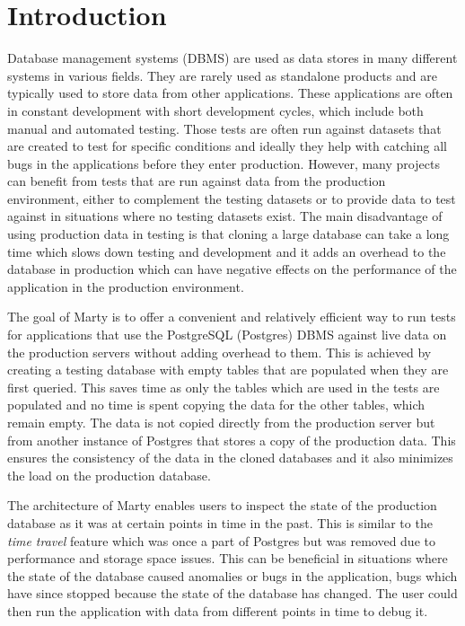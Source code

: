 \chapter{Introduction}
\setcounter{page}{1}
Database management systems (DBMS) are used as data stores in many different systems in various fields.
They are rarely used as standalone products and are typically used to store data from other applications.
These applications are often in constant development with short development cycles, which include both manual and automated testing.
Those  tests are often run against datasets that are created to test for specific conditions and ideally they help with catching all bugs in the applications before they enter production. However, many projects can benefit from tests that are run against data from the production environment, either to complement the testing datasets or to provide data to test against in situations where no testing datasets exist.
The main disadvantage of using production data in testing is that cloning a large database can take a long time which slows down testing and development and it adds an overhead to the database in production which can have negative effects on the performance of the application in the production environment.

The goal of Marty is to offer a convenient and relatively efficient way to run tests for applications that use the PostgreSQL (Postgres) DBMS against live data on the production servers without adding overhead to them.
This is achieved by creating a testing database with empty tables that are populated  when they are first queried.
This saves time as only the tables which are used in the tests are populated and no time is spent copying the data for the other tables, which remain empty.
The data is not copied directly from the production server but from another instance of Postgres that stores a copy of the production data.
This ensures the consistency of the data in the cloned databases and it also minimizes the load on the production database.

The architecture of Marty enables users to inspect the state of the production database as it was at certain points in time in the past.
This is similar to the \textit{time travel} feature which was once a part of Postgres but was removed due to performance and storage space issues.
This can be beneficial in situations where the state of the database caused anomalies or bugs in the application, bugs which have since stopped because the state of the database has changed.
The user could then run the application with data from different points in time to debug it.





